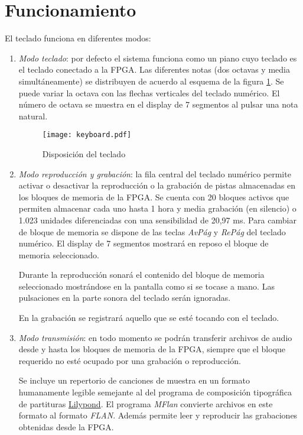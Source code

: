 \documentclass{article}
\begin{document}
\section{Funcionamiento}

	El teclado funciona en diferentes modos:

	\begin{enumerate}
		\item {\itshape Modo teclado}: por defecto el sistema funciona como un piano cuyo teclado es el teclado conectado a la FPGA. Las diferentes notas (dos octavas y media simultáneamente) se distribuyen de acuerdo al esquema de la figura \ref{fig:teclado}. Se puede variar la octava con las flechas verticales del teclado numérico. El número de octava se muestra en el display de 7 segmentos al pulsar una nota natural.

\begin{figure}[ht] \centering
	\texttt{[image: keyboard.pdf]}

	\caption{Disposición del teclado}
	\label{fig:teclado}
\end{figure}

	\item {\itshape Modo reproducción y grabación}: la fila central del teclado numérico permite activar o desactivar la reproducción o la grabación de pistas almacenadas en los bloques de memoria de la FPGA. Se cuenta con 20 bloques activos que permiten almacenar cada uno hasta 1 hora y media grabación (en silencio) o 1.023 unidades diferenciadas con una sensibilidad de 20,97 ms. Para cambiar de bloque de memoria se dispone de las teclas {\itshape AvPág} y {\itshape RePág} del teclado numérico. El display de 7 segmentos mostrará en reposo el bloque de memoria seleccionado.

		Durante la reproducción sonará el contenido del bloque de memoria seleccionado mostrándose en la pantalla como si se tocase a mano. Las pulsaciones en la parte sonora del teclado serán ignoradas.

		En la grabación se registrará aquello que se esté tocando con el teclado.

	\item {\itshape Modo transmisión}: en todo momento se podrán transferir archivos de audio desde y hasta los bloques de memoria de la FPGA, siempre que el bloque requerido no esté ocupado por una grabación o reproducción.

		Se incluye un repertorio de canciones de muestra en un formato humanamente legible semejante al del programa de composición tipográfica de partituras \href{http://lilypond.org/}{Lilypond}. El programa {\itshape MFlan} convierte archivos en este formato al formato {\itshape FLAN}. Además permite leer y reproducir las grabaciones obtenidas desde la FPGA.


\end{enumerate}
\end{document}
